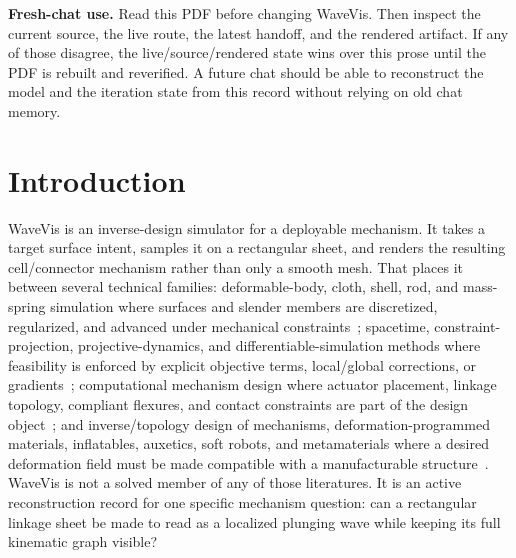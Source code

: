 \documentclass[12pt,letterpaper]{article}
\begin{document}
\vspace{0.65em}
\noindent\textbf{Fresh-chat use.} Read this PDF before changing WaveVis. Then inspect the current source, the live route, the latest handoff, and the rendered artifact. If any of those disagree, the live/source/rendered state wins over this prose until the PDF is rebuilt and reverified. A future chat should be able to reconstruct the model and the iteration state from this record without relying on old chat memory.

\newpage
\pagestyle{fancy}
\tableofcontents
\newpage

\section{Introduction}

WaveVis is an inverse-design simulator for a deployable mechanism. It takes a target surface intent, samples it on a rectangular sheet, and renders the resulting cell/connector mechanism rather than only a smooth mesh. That places it between several technical families: deformable-body, cloth, shell, rod, and mass-spring simulation where surfaces and slender members are discretized, regularized, and advanced under mechanical constraints~\cite{terzopoulos_elastically_1987,baraff_witkin_1998,grinspun_discrete_shells_2003,bergou_discrete_rods_2008,liu_fast_mass_spring_2013}; spacetime, constraint-projection, projective-dynamics, and differentiable-simulation methods where feasibility is enforced by explicit objective terms, local/global corrections, or gradients~\cite{witkin_spacetime_1988,muller_position_based_2007,sorkine_arap_2007,bouaziz_projective_2014,du_diffpd_2022}; computational mechanism design where actuator placement, linkage topology, compliant flexures, and contact constraints are part of the design object~\cite{skouras_actuated_deformable_2013,coros_mechanical_characters_2013,thomaszewski_linkage_characters_2014,megaro_compliant_mechanisms_2017,zhu_linkedit_2015,mccarthy_linkages_2000,hunt_kinematic_geometry_1978}; and inverse/topology design of mechanisms, deformation-programmed materials, inflatables, auxetics, soft robots, and metamaterials where a desired deformation field must be made compatible with a manufacturable structure~\cite{bendsoe_kikuchi_1988,sigmund_compliant_1997,sigmund_maute_2013,bickel_deformation_materials_2010,skouras_designing_inflatable_2014,konakovic_auxetic_2016,panetta_surface_inflatables_2021,rus_tolley_soft_robots_2015,coulais_textured_2016,kadic_3d_metamaterials_2019}. WaveVis is not a solved member of any of those literatures. It is an active reconstruction record for one specific mechanism question: can a rectangular linkage sheet be made to read as a localized plunging wave while keeping its full kinematic graph visible?
\end{document}
